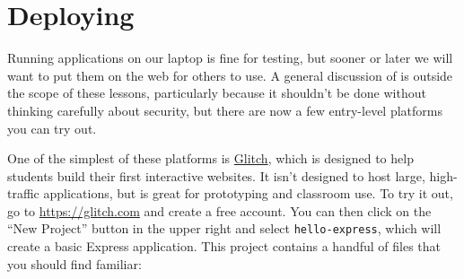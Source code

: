 \chapter{Deploying}\label{s:deploy}

Running applications on our laptop is fine for testing,
but sooner or later we will want to put them on the web for others to use.
A general discussion of  is outside the scope of these lessons,
particularly because it shouldn't be done without thinking carefully about security,
but there are now a few entry-level platforms you can try out.

One of the simplest of these platforms is \href{https://glitch.com/}{Glitch},
which is designed to help students build their first interactive websites.
It isn't designed to host large, high-traffic applications,
but is great for prototyping and classroom use.
To try it out,
go to \url{https://glitch.com} and create a free account.
You can then click on the ``New Project'' button in the upper right and select \texttt{hello-express},
which will create a basic Express application.
This project contains a handful of files that you should find familiar:


